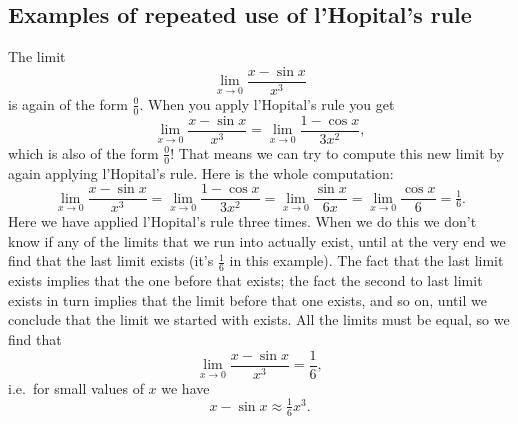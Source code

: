 \subsection{Examples of repeated use of l'Hopital's rule}
The limit
\[
\lim_{x\to 0} \frac {x - \sin x}{x^3}
\]
is again of the form $\frac00$.  When you apply l'Hopital's rule you
get
\[
\lim_{x\to 0} \frac {x - \sin x}{x^3}
=
\lim_{x\to 0} \frac {1 - \cos x}{3x^2},
\]
which is also of the form $\frac00$!  That means we can try to compute
this new limit by again applying l'Hopital's rule.  Here is the whole
computation:
\[
  \lim_{x\to 0} \frac {x - \sin x}{x^3}
  = \lim_{x\to 0} \frac {1 - \cos x}{3x^2} 
  = \lim_{x\to 0} \frac {\sin x}{6x} 
  = \lim_{x\to 0} \frac {\cos x}{6} 
  = \tfrac16.
\]
Here we have applied l'Hopital's rule three times.  When we do this we
don't know if any of the limits that we run into actually exist, until
at the very end we find that the last limit exists (it's $\frac16$ in
this example).  The fact that the last limit exists implies that the
one before that exists; the fact the second to last limit exists in
turn implies that the limit before that one exists, and so on, until
we conclude that the limit we started with exists.  All the limits
must be equal, so we find that
\[
  \lim_{x\to 0} \frac {x - \sin x}{x^3} = \frac16,
\]
i.e.~for small values of $x$ we have
\[
x-\sin x \approx \tfrac16 x^3.
\]


